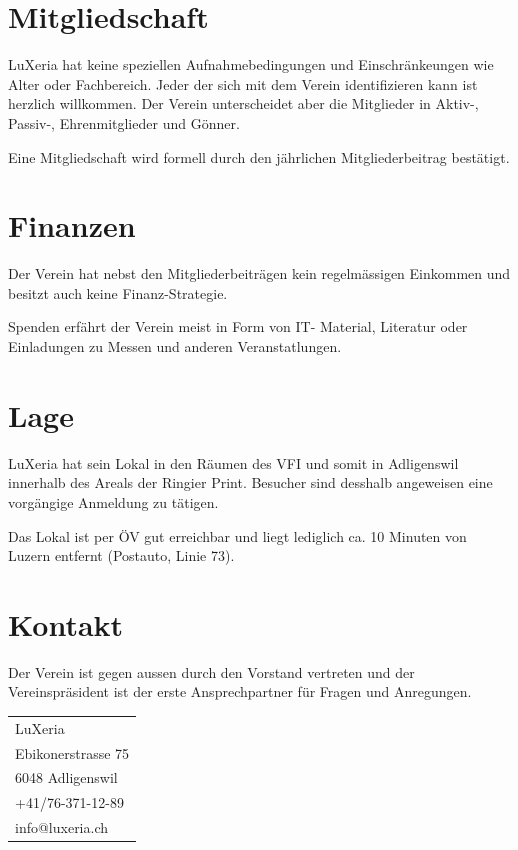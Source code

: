 \documentclass[10pt,foldmark,notumble]{leaflet}
\begin{document}
\section{Mitgliedschaft}
LuXeria hat keine speziellen Aufnahmebedingungen und 
Einschränkeungen wie Alter oder Fachbereich. Jeder der
sich mit dem Verein identifizieren kann ist herzlich 
willkommen. Der Verein unterscheidet aber die Mitglieder
in Aktiv-, Passiv-, Ehrenmitglieder und Gönner.

Eine Mitgliedschaft wird formell durch den jährlichen 
Mitgliederbeitrag bestätigt. 

\section{Finanzen}
Der Verein hat nebst den Mitgliederbeiträgen kein
regelmässigen Einkommen und besitzt auch keine
Finanz-Strategie. 

Spenden erfährt der Verein meist in Form von IT-
Material, Literatur oder Einladungen zu Messen
und anderen Veranstatlungen.

\section{Lage}
LuXeria hat sein Lokal in den Räumen des VFI 
und somit in Adligenswil innerhalb des Areals 
der Ringier Print. Besucher sind desshalb angeweisen
eine vorgängige Anmeldung zu tätigen. 

Das Lokal ist per ÖV gut erreichbar und liegt lediglich 
ca. 10 Minuten von Luzern entfernt (Postauto, Linie 73).

\newpage

\section{Kontakt}
Der Verein ist gegen aussen durch den Vorstand vertreten
und der Vereinspräsident ist der erste Ansprechpartner
für Fragen und Anregungen.

\begin{table}[h!]
        \begin{tabular}{l}
        LuXeria \\
        Ebikonerstrasse 75 \\
        6048 Adligenswil \\
        +41/76-371-12-89 \\
        info@luxeria.ch 
        \end{tabular}
\end{table}
\end{document}
